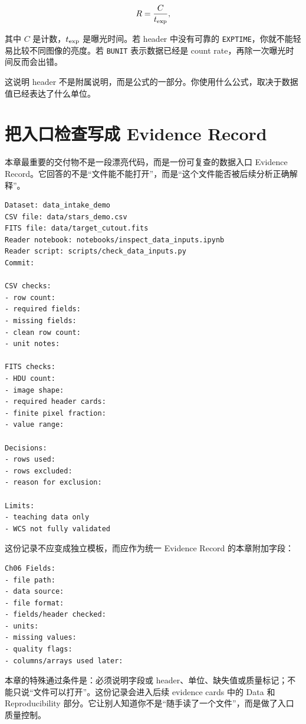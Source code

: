 \[
R = \frac{C}{t_{\rm exp}},
\]

其中 \(C\) 是计数，\(t_{\rm exp}\) 是曝光时间。若 header 中没有可靠的 \texttt{EXPTIME}，你就不能轻易比较不同图像的亮度。若 \texttt{BUNIT} 表示数据已经是 count rate，再除一次曝光时间反而会出错。

这说明 header 不是附属说明，而是公式的一部分。你使用什么公式，取决于数据值已经表达了什么单位。

\section{把入口检查写成 Evidence Record}

本章最重要的交付物不是一段漂亮代码，而是一份可复查的数据入口 Evidence Record。它回答的不是“文件能不能打开”，而是“这个文件能否被后续分析正确解释”。

\begin{examplebox}[最小数据读入检查记录]
\begin{lstlisting}[style=terminal]
Dataset: data_intake_demo
CSV file: data/stars_demo.csv
FITS file: data/target_cutout.fits
Reader notebook: notebooks/inspect_data_inputs.ipynb
Reader script: scripts/check_data_inputs.py
Commit:

CSV checks:
- row count:
- required fields:
- missing fields:
- clean row count:
- unit notes:

FITS checks:
- HDU count:
- image shape:
- required header cards:
- finite pixel fraction:
- value range:

Decisions:
- rows used:
- rows excluded:
- reason for exclusion:

Limits:
- teaching data only
- WCS not fully validated
\end{lstlisting}
\end{examplebox}

这份记录不应变成独立模板，而应作为统一 Evidence Record 的本章附加字段：

\begin{examplebox}
\begin{lstlisting}[style=terminal]
Ch06 Fields:
- file path:
- data source:
- file format:
- fields/header checked:
- units:
- missing values:
- quality flags:
- columns/arrays used later:
\end{lstlisting}
\end{examplebox}

本章的特殊通过条件是：必须说明字段或 header、单位、缺失值或质量标记；不能只说“文件可以打开”。这份记录会进入后续 evidence cards 中的 Data 和 Reproducibility 部分。它让别人知道你不是“随手读了一个文件”，而是做了入口质量控制。

